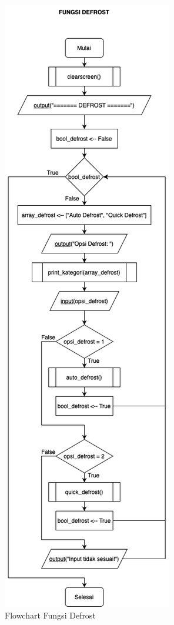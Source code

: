 \documentclass[conference]{IEEEtran}
\begin{document}
\begin{figure}[ht]
    \centering
    \def\svgwidth{\columnwidth}
    \centerline{\includegraphics[scale=0.435]{Defrost.png}}
    \caption{Flowchart Fungsi Defrost}
    \label{fig8}
\end{figure}
\end{document}
